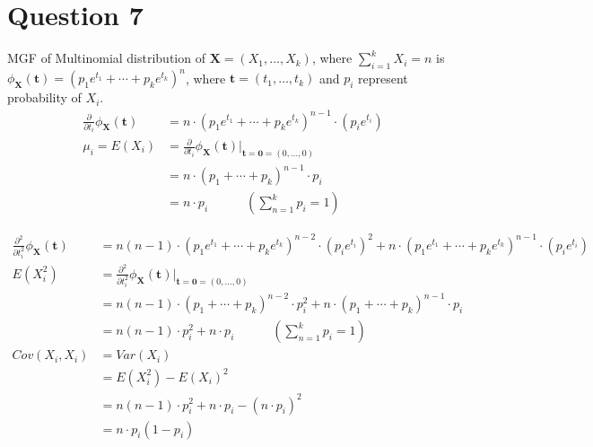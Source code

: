 \documentclass[11pt, fleqn]{article}
\begin{document}
\newpage
\section*{Question 7}
\setcounter{equation}{0}

MGF of Multinomial distribution of $\mathbf{X} = (X_1, \dots, X_k)$, where $\sum_{i=1}^{k} X_i = n$ is $\phi_{\mathbf{X}}(\mathbf{t}) = (p_1 e^{t_1} + \cdots + p_k e^{t_k})^{n}$, where $\mathbf{t} = (t_1, \dots, t_k)$ and $p_i$ represent probability of $X_i$. \\
\begin{equation*}
    \begin{split}
        \frac{\partial}{\partial t_i} \phi_{\mathbf{X}}(\mathbf{t}) &= n \cdot (p_1 e^{t_1} + \cdots + p_k e^{t_k})^{n-1} \cdot (p_i e^{t_i}) \\
        \mu_i = E(X_i) &= \frac{\partial}{\partial t_i} \phi_{\mathbf{X}}(\mathbf{t}) \bigg\rvert_{\mathbf{t} = \mathbf{0} = (0, \dots, 0)} \\
            &= n \cdot (p_1 + \cdots + p_k)^{n-1} \cdot p_i \\
            &= n \cdot p_i \hspace{3em} (\sum_{n=1}^{k} p_i = 1) 
    \end{split}
\end{equation*}

\begin{equation*}
    \begin{split}
        \frac{\partial^2}{\partial t_i^2} \phi_{\mathbf{X}}(\mathbf{t}) &= n(n-1) \cdot (p_1 e^{t_1} + \cdots + p_k e^{t_k})^{n-2} \cdot (p_i e^{t_i})^2 + n \cdot (p_1 e^{t_1} + \cdots + p_k e^{t_k})^{n-1} \cdot (p_i e^{t_i}) \\
        E(X_i^2) &= \frac{\partial^2}{\partial t_i^2} \phi_{\mathbf{X}}(\mathbf{t}) \bigg\rvert_{\mathbf{t} = \mathbf{0} = (0, \dots, 0)} \\
            &= n(n-1) \cdot (p_1 + \cdots + p_k)^{n-2} \cdot p_i^2 + n \cdot (p_1 + \cdots + p_k)^{n-1} \cdot p_i \\
            &= n(n-1) \cdot p_i^2 + n \cdot p_i \hspace{3em} (\sum_{n=1}^{k} p_i = 1) \\
        Cov(X_i, X_i) &= Var(X_i) \\
            &= E(X_i^2) - E(X_i)^2 \\
            &= n(n-1) \cdot p_i^2 + n \cdot p_i - (n \cdot p_i)^2 \\
            &= n \cdot p_i (1 - p_i) \\
    \end{split}
\end{equation*}
\end{document}
